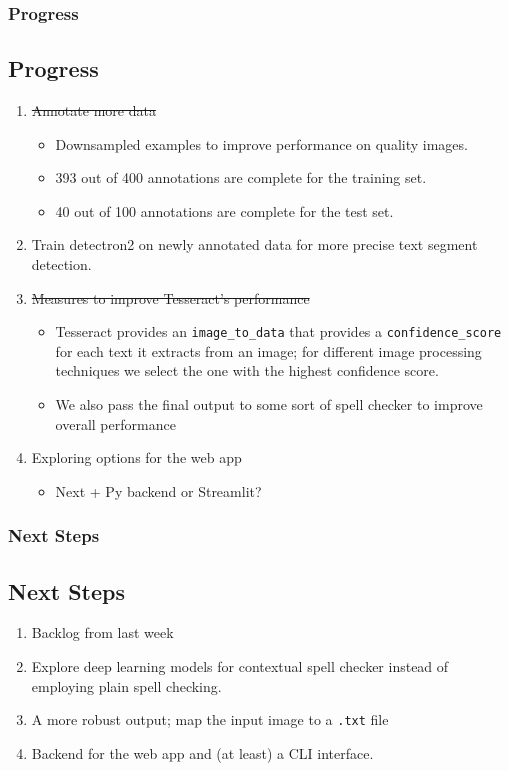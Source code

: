 \documentclass[compress]{beamer}
\begin{document}
\begin{frame}
    \frametitle{Progress}
    \subsection{Progress}
    \begin{enumerate}
    \item \sout{Annotate more data}
            \begin{itemize}
                \item Downsampled examples to improve performance on quality
                    images.
                \item 393 out of 400 annotations are complete for the training set.
                \item 40 out of 100 annotations are complete for the test set.
            \end{itemize}
        \item Train detectron2 on newly annotated data for more precise text
            segment detection.
        \item \sout{Measures to improve Tesseract's performance}
            \begin{itemize}
                    \item Tesseract provides an \texttt{image\_to\_data} that
                        provides a \texttt{confidence\_score} for each text it
                        extracts from an image; for different image processing
                        techniques we select the one with the highest
                        confidence score.
                    \item We also pass the final output to some sort of spell
                        checker to improve overall performance
            \end{itemize}
        \item Exploring options for the web app
            \begin{itemize}
                \item Next + Py backend or Streamlit?
            \end{itemize}
     \end{enumerate}
    \vfill
\end{frame}

\begin{frame}
    \frametitle{Next Steps}
    \subsection{Next Steps}
    \begin{enumerate}
        \item Backlog from last week
        \item Explore deep learning models for contextual spell checker instead
            of employing plain spell checking.
        \item A more robust output; map the input image to a \texttt{.txt} file
        \item Backend for the web app and (at least) a CLI interface.
    \end{enumerate}

    
\end{frame}
\end{document}
